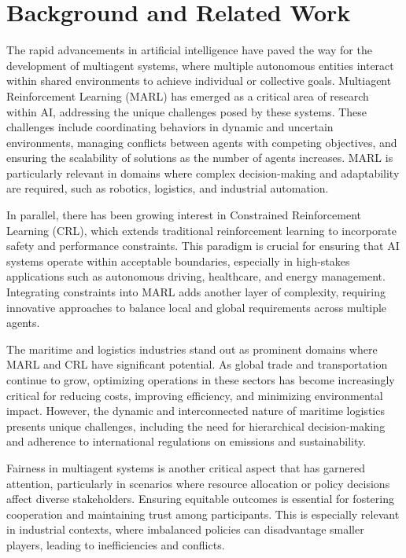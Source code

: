\section{Background and Related Work}
\label{background_related_work}

The rapid advancements in artificial intelligence have paved the way for the development of multiagent systems, where multiple autonomous entities interact within shared environments to achieve individual or collective goals. Multiagent Reinforcement Learning (MARL) has emerged as a critical area of research within AI, addressing the unique challenges posed by these systems. These challenges include coordinating behaviors in dynamic and uncertain environments, managing conflicts between agents with competing objectives, and ensuring the scalability of solutions as the number of agents increases. MARL is particularly relevant in domains where complex decision-making and adaptability are required, such as robotics, logistics, and industrial automation.

In parallel, there has been growing interest in Constrained Reinforcement Learning (CRL), which extends traditional reinforcement learning to incorporate safety and performance constraints. This paradigm is crucial for ensuring that AI systems operate within acceptable boundaries, especially in high-stakes applications such as autonomous driving, healthcare, and energy management. Integrating constraints into MARL adds another layer of complexity, requiring innovative approaches to balance local and global requirements across multiple agents.

The maritime and logistics industries stand out as prominent domains where MARL and CRL have significant potential. As global trade and transportation continue to grow, optimizing operations in these sectors has become increasingly critical for reducing costs, improving efficiency, and minimizing environmental impact. However, the dynamic and interconnected nature of maritime logistics presents unique challenges, including the need for hierarchical decision-making and adherence to international regulations on emissions and sustainability.

Fairness in multiagent systems is another critical aspect that has garnered attention, particularly in scenarios where resource allocation or policy decisions affect diverse stakeholders. Ensuring equitable outcomes is essential for fostering cooperation and maintaining trust among participants. This is especially relevant in industrial contexts, where imbalanced policies can disadvantage smaller players, leading to inefficiencies and conflicts.

